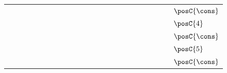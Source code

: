 {\begin{tabular}{ccccccccccccccccccccccc|l}
\gcell{$$} & \gcell{$\posC{\circ}$} & \gcell{$\posC{\circ}$} & \gcell{$\posC{\circ}$} & \gcell{$\posC{\circ}$} & \cellcolor{blue!10}\gcell{$\posC{\circ}$} & \gcell{$\posC{\circ}$} & \gcell{$$} & \gcell{$$} & \gcell{$$} & \gcell{$\posC{\circ}$} & \gcell{$\posC{\circ}$} & \gcell{$\posC{\circ}$} & \gcell{$$} & \gcell{$$} & \gcell{$$} & \gcell{$$} & \gcell{$$} & \gcell{$$} & \gcell{$$} & \gcell{$$} & \gcell{$$} & \gcell{$$} & \cellcolor{blue!10}$\posC{\cons}$ \\
\gcell{$$} & \gcell{$\posC{\circ}$} & \gcell{$\posC{\circ}$} & \gcell{$\posC{\circ}$} & \gcell{$\posC{\circ}$} & \cellcolor{blue!10}\gcell{$\posC{\circ}$} & \gcell{$\posC{\circ}$} & \gcell{$$} & \gcell{$$} & \gcell{$$} & \gcell{$\posC{\circ}$} & \gcell{$\posC{\circ}$} & \gcell{$\posC{\circ}$} & \gcell{$\posD{\bullet}$} & \gcell{$\posC{\circ}$} & \gcell{$$} & \gcell{$$} & \gcell{$$} & \gcell{$$} & \gcell{$$} & \gcell{$$} & \gcell{$$} & \gcell{$$} & \cellcolor{blue!10}$\posC{4}$ \\
\gcell{$$} & \gcell{$\posC{\circ}$} & \gcell{$\posC{\circ}$} & \gcell{$\posC{\circ}$} & \gcell{$\posC{\circ}$} & \cellcolor{blue!10}\gcell{$\posC{\circ}$} & \gcell{$\posC{\circ}$} & \gcell{$$} & \gcell{$$} & \gcell{$$} & \gcell{$\posC{\circ}$} & \gcell{$\posC{\circ}$} & \gcell{$\posC{\circ}$} & \gcell{$\posC{\circ}$} & \gcell{$\posC{\circ}$} & \gcell{$$} & \gcell{$$} & \gcell{$$} & \gcell{$$} & \gcell{$$} & \gcell{$$} & \gcell{$$} & \gcell{$$} & \cellcolor{blue!10}$\posC{\cons}$ \\
\gcell{$$} & \gcell{$\posC{\circ}$} & \gcell{$\posC{\circ}$} & \gcell{$\posC{\circ}$} & \gcell{$\posC{\circ}$} & \cellcolor{blue!10}\gcell{$\posC{\circ}$} & \gcell{$\posC{\circ}$} & \gcell{$$} & \gcell{$$} & \gcell{$$} & \gcell{$\posC{\circ}$} & \gcell{$\posC{\circ}$} & \gcell{$\posC{\circ}$} & \gcell{$\posC{\circ}$} & \gcell{$\posC{\circ}$} & \gcell{$\posD{\bullet}$} & \gcell{$\posC{\circ}$} & \gcell{$$} & \gcell{$$} & \gcell{$$} & \gcell{$$} & \gcell{$$} & \gcell{$$} & \cellcolor{blue!10}$\posC{5}$ \\
\gcell{$$} & \gcell{$\posC{\circ}$} & \gcell{$\posC{\circ}$} & \gcell{$\posC{\circ}$} & \gcell{$\posC{\circ}$} & \cellcolor{blue!10}\gcell{$\posC{\circ}$} & \gcell{$\posC{\circ}$} & \gcell{$$} & \gcell{$$} & \gcell{$$} & \gcell{$\posC{\circ}$} & \gcell{$\posC{\circ}$} & \gcell{$\posC{\circ}$} & \gcell{$\posC{\circ}$} & \gcell{$\posC{\circ}$} & \gcell{$\posC{\circ}$} & \gcell{$\posC{\circ}$} & \gcell{$$} & \gcell{$$} & \gcell{$$} & \gcell{$$} & \gcell{$$} & \gcell{$$} & \cellcolor{blue!10}$\posC{\cons}$ \\

\end{tabular}}
